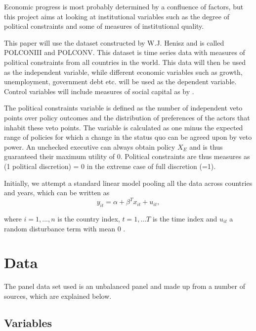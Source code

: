 \documentclass{article}\usepackage{graphicx, color}
\begin{document}
Economic progress is most probably determined by a confluence of factors,
but this project aims at looking at institutional variables such as
the degree of political constraints and some of measures of institutional
quality.

This paper will use the dataset constructed by W.J. Henisz and is
called POLCONIII and POLCONV. This dataset is time series data with
measures of political constraints from all countries in the world.
This data will then be used as the independent variable, while different
economic variables such as growth, unemployment, government debt etc.
will be used as the dependent variable. Control variables will include
measures of social capital as by \citet{barro1996democracy}.

The political constraints variable is defined as the number of independent
veto points over policy outcomes and the distribution of preferences
of the actors that inhabit these veto points. The variable is calculated
as one minus the expected range of policies for which a change in
the status quo can be agreed upon by veto power. An unchecked executive
can always obtain policy $X_{E}$ and is thus guaranteed their maximum
utility of 0. Political constraints are thus measures as (1 \textendash{}
political discretion) = 0 in the extreme case of full discretion (=1). 

Initially, we attempt a standard linear model pooling all the data
across countries and years, which can be written as 
\[
y_{it}=\alpha+\beta^{T}x_{it}+u_{it},
\]


where $i=1,...,n$ is the country index, $t=1,...T$ is the time index
and $u_{it}$ a random disturbance term with mean 0 \citep[p. 2]{croissant2008paneldata}.


\section{Data}

The panel data set used is an unbalanced panel and made up from a
number of sources, which are explained below.


\subsection{Variables}
\end{document}
